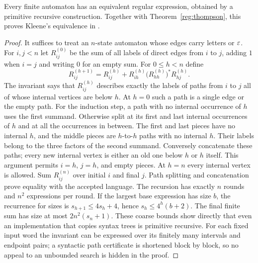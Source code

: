 \begin{theorem}\label{reg:eliminate}
Every finite automaton has an equivalent regular expression, obtained by
a primitive recursive construction.  Together with
Theorem~\ref{reg:thompson}, this proves Kleene's equivalence in \ipra.
\end{theorem}
\begin{proof}
It suffices to treat an $n$-state automaton whose edges carry letters or
$\varepsilon$.  For $i,j<n$ let $R^{(0)}_{ij}$ be the sum of all labels of direct
edges from $i$ to $j$, adding $1$ when $i=j$ and writing $0$ for an empty
sum.  For $0\leq h<n$ define
\[
 R^{(h+1)}_{ij}
 =R^{(h)}_{ij}
  +R^{(h)}_{ih}\bigl(R^{(h)}_{hh}\bigr)^*R^{(h)}_{hj}.
\]
The invariant says that $R^{(h)}_{ij}$ describes exactly the labels of
paths from $i$ to $j$ all of whose internal vertices are below $h$.
At $h=0$ such a path is a single edge or the empty path.  For the induction
step, a path with no internal occurrence of $h$ uses the first summand.
Otherwise split at its first and last internal occurrences of $h$ and at
all the occurrences in between.  The first and last pieces have no
internal $h$, and the middle pieces are $h$-to-$h$ paths with no internal
$h$.  Their labels belong to the three factors of the second summand.
Conversely concatenate these paths; every new internal vertex is either
an old one below $h$ or $h$ itself.  This argument permits $i=h$, $j=h$,
and empty pieces.
At $h=n$ every internal vertex is allowed.  Sum $R^{(n)}_{ij}$ over
initial $i$ and final $j$.  Path splitting and concatenation prove equality
with the accepted language.
The recursion has exactly $n$ rounds and $n^2$ expressions per round.
If the largest base expression has size $b$, the recurrence for sizes is
$s_{h+1}\leq4s_h+4$, hence $s_h\leq4^h(b+2)$.  The final finite sum has
size at most $2n^2(s_n+1)$.  These coarse bounds show directly that even
an implementation that copies syntax trees is primitive recursive.
For each fixed input word the invariant can be expressed over its
finitely many intervals and endpoint pairs; a syntactic path certificate
is shortened block by block, so no appeal to an unbounded search is hidden
in the proof.
\end{proof}

